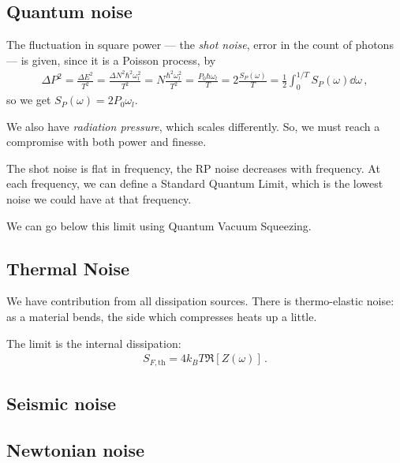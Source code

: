 \documentclass[main.tex]{subfiles}
\begin{document}
\subsection{Quantum noise}

The fluctuation in square power --- the \emph{shot noise}, error in the count of photons ---  is given, since it is a Poisson process, by
%
\begin{align}
\Delta P^2 = \frac{\Delta E^2}{T^2} = 
\frac{\Delta N^2 \hbar^2 \omega_{l}^2}{T^2}
= N \frac{\hbar^2   \omega_{l}^2}{T^2}
= \frac{P_0 \hbar \omega_{l}}{T}
= 2\frac{S_P(\omega )}{T}
= \frac{1}{2} \int_{0}^{1/T} S_P (\omega) \dd{\omega }
\,,
\end{align}
%
so we get \(S_P (\omega ) = 2 P_0 \omega_{l}\). 

We also have \emph{radiation pressure}, which scales differently. 
So, we must reach a compromise with both power and finesse. 

The shot noise is flat in frequency, the RP noise decreases with frequency. 
At each frequency, we can define a Standard Quantum Limit, which is the lowest noise we could have at that frequency. 

We can go below this limit using Quantum Vacuum Squeezing. 

\subsection{Thermal Noise}

We have contribution from all dissipation sources. 
There is thermo-elastic noise: as a material bends, the side which compresses heats up a little. 

The limit is the internal dissipation: 
%
\begin{align}
S_{F, \text{th}} = 4 k_B T \Re[Z(\omega )]  
\,.
\end{align}

\subsection{Seismic noise}

\subsection{Newtonian noise}
\end{document}
